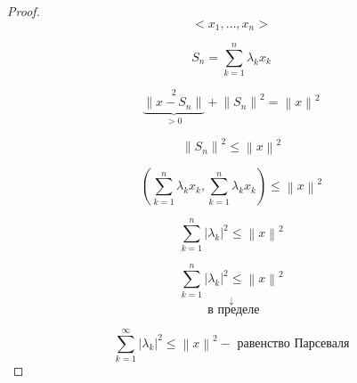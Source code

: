 \documentclass[12pt, a4paper]{report}
\begin{document}
\begin{proof}
    \[ <x_1, \ldots, x_n> \] 

    \[ S_n = \sum_{k =1}^{n  }   \lambda_k x_k\] 

    \[\underbrace{ \left\lVert x - S_n   \right\rVert}_{> 0} ^2   + \left\lVert S_n      \right\rVert ^2 = \left\lVert x  \right\rVert ^2 \] 

    \[ \left\lVert  S_n      \right\rVert  ^2 \le  \left\lVert x  \right\rVert ^2 \] 

    \[ \left( \sum_{k=1} ^{n  } \lambda_k x_k , \sum_{k=1} ^{n  } \lambda_k x_k  \right) \le  \left\lVert x  \right\rVert ^2 \] 

    \[ \sum_{k=1} ^{n  } \left\lvert \lambda_k     \right\rvert ^2 \le  \left\lVert x  \right\rVert ^2 \] 

    \[ \sum_{k=1} ^{n  } \left\lvert \lambda_k     \right\rvert ^2 \le  \left\lVert x  \right\rVert ^2 \] 
    \[ \overset{\displaystyle \downarrow }{\text{ в пределе}}  \]

    \[ \sum_{k=1} ^{\infty  } \left\lvert \lambda_k     \right\rvert ^2 \le  \left\lVert x  \right\rVert ^2   - \text{ равенство Парсеваля}  \] 

\end{proof}




\ifdefined\mainfile
\else
\end{document}
